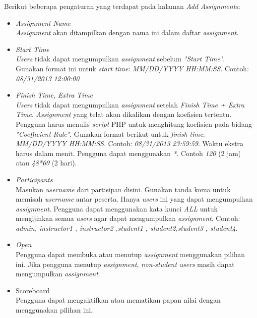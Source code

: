 Berikut beberapa pengaturan yang terdapat pada halaman \textit{Add Assignments}:
\begin{itemize}
	\item \textit{Assignment Name} \\
	\textit{Assignment} akan ditampilkan dengan nama ini dalam daftar \textit{assignment}.
	
	\item \textit{Start Time} \\
	\textit{Users} tidak dapat mengumpulkan \textit{assignment} sebelum \textit{"Start Time"}. Gunakan format ini untuk \textit{start time}: \textit{MM/DD/YYYY HH:MM:SS}. Contoh: \textit{08/31/2013 12:00:00}
	
	\item \textit{Finish Time, Extra Time}\\
	\textit{Users} tidak dapat mengumpulkan \textit{assignment} setelah \textit{Finish Time + Extra Time}. \textit{Assignment} yang telat akan dikalikan dengan koefisien tertentu. Pengguna harus menulis \textit{script} PHP untuk menghitung koefisien pada bidang \textit{"Coefficient Rule"}. Gunakan format berikut untuk \textit{finish time}: \textit{MM/DD/YYYY HH:MM:SS}. Contoh: \textit{08/31/2013 23:59:59}. Waktu ekstra harus dalam menit. Pengguna dapat menggunakan \textit{*}. Contoh \textit{120} (2 jam) atau \textit{48*60} (2 hari).
	
	\item \textit{Participants} \\
	Masukan \textit{username} dari partisipan disini. Gunakan tanda koma untuk memisah \textit{username} antar peserta. Hanya \textit{users} ini yang dapat mengumpulkan \textit{assignment}. Pengguna dapat menggunakan kata kunci \textit{ALL} untuk mengijinkan semua \textit{users} agar dapat mengumpulkan \textit{assignment}. Contoh: \textit{admin, instructor1 , instructor2 ,student1  ,   student2,student3 , student4}.
	
	\item \textit{Open} \\
	Pengguna dapat membuka atau menutup \textit{assignment} menggunakan pilihan ini. Jika pengguna menutup \textit{assignment}, \textit{non-student users} masih dapat mengumpulkan \textit{assignment}.
	
	\item Scoreboard \\
	Pengguna dapat mengaktifkan atau mematikan papan nilai dengan menggunakan pilihan ini.
	

\end{itemize}
